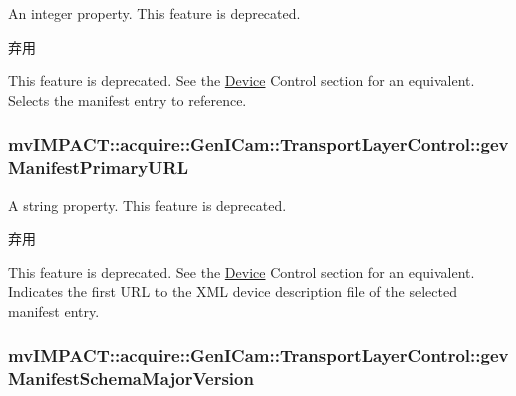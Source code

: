 An integer property. This feature is deprecated. 

\begin{DoxyRefDesc}{弃用}
\item[\hyperlink{deprecated__deprecated000086}{弃用}]This feature is deprecated. See the \hyperlink{classmv_i_m_p_a_c_t_1_1acquire_1_1_device}{Device} Control section for an equivalent. Selects the manifest entry to reference. \end{DoxyRefDesc}
\hypertarget{classmv_i_m_p_a_c_t_1_1acquire_1_1_gen_i_cam_1_1_transport_layer_control_a5f62b8dfe1170a36c3dcef34ea5b4825}{
\subsubsection[{gev\+Manifest\+Primary\+U\+R\+L}]{ mv\+I\+M\+P\+A\+C\+T\+::acquire\+::\+Gen\+I\+Cam\+::\+Transport\+Layer\+Control\+::gev\+Manifest\+Primary\+U\+R\+L}}\label{classmv_i_m_p_a_c_t_1_1acquire_1_1_gen_i_cam_1_1_transport_layer_control_a5f62b8dfe1170a36c3dcef34ea5b4825}


A string property. This feature is deprecated. 

\begin{DoxyRefDesc}{弃用}
\item[\hyperlink{deprecated__deprecated000092}{弃用}]This feature is deprecated. See the \hyperlink{classmv_i_m_p_a_c_t_1_1acquire_1_1_device}{Device} Control section for an equivalent. Indicates the first U\+R\+L to the X\+M\+L device description file of the selected manifest entry. \end{DoxyRefDesc}
\hypertarget{classmv_i_m_p_a_c_t_1_1acquire_1_1_gen_i_cam_1_1_transport_layer_control_adb743bf3011dfaf67eee22d4cfdeab6c}{
\subsubsection[{gev\+Manifest\+Schema\+Major\+Version}]{ mv\+I\+M\+P\+A\+C\+T\+::acquire\+::\+Gen\+I\+Cam\+::\+Transport\+Layer\+Control\+::gev\+Manifest\+Schema\+Major\+Version}}\label{classmv_i_m_p_a_c_t_1_1acquire_1_1_gen_i_cam_1_1_transport_layer_control_adb743bf3011dfaf67eee22d4cfdeab6c}


